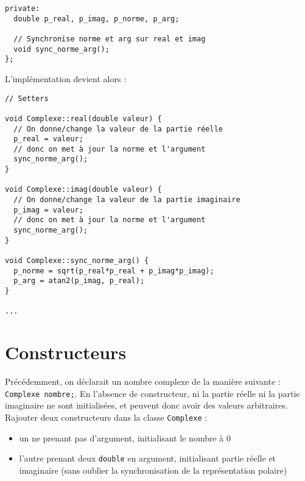\documentclass{book}
\newcommand{\inline}[1]{\texttt{#1}}
\begin{document}
\begin{correction}
\begin{verbatim}
private:
  double p_real, p_imag, p_norme, p_arg;

  // Synchronise norme et arg sur real et imag
  void sync_norme_arg();
};
\end{verbatim}

L'implémentation devient alors :

\begin{verbatim}
// Setters

void Complexe::real(double valeur) {
  // On donne/change la valeur de la partie réelle 
  p_real = valeur;
  // donc on met à jour la norme et l'argument
  sync_norme_arg();
}

void Complexe::imag(double valeur) {
  // On donne/change la valeur de la partie imaginaire 
  p_imag = valeur;
  // donc on met à jour la norme et l'argument
  sync_norme_arg();
}

void Complexe::sync_norme_arg() {
  p_norme = sqrt(p_real*p_real + p_imag*p_imag);
  p_arg = atan2(p_imag, p_real);
}

...

\end{verbatim}


\end{correction}

\section{Constructeurs}

Précédemment, on déclarait un nombre complexe de la manière suivante : \inline{Complexe nombre;}. En l'absence de constructeur, ni la partie réelle ni la partie imaginaire ne sont initialisées, et peuvent donc avoir des valeurs arbitraires. Rajouter deux constructeurs dans la classe \inline{Complexe} :
\begin{itemize}
\item un ne prenant pas d'argument, initialisant le nombre à 0
\item l'autre prenant deux \inline{double} en argument, initialisant partie réelle et imaginaire (sans oublier la synchronisation de la représentation polaire)
\end{itemize}
\end{document}
